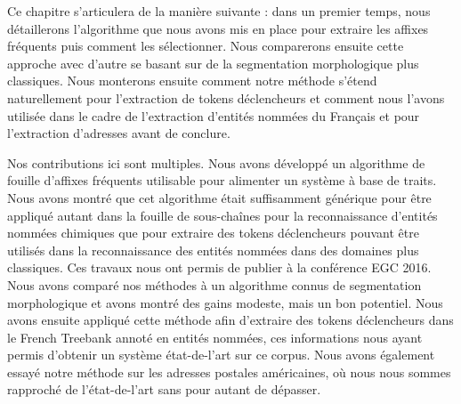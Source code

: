 \documentclass[PhD-Yoann-Dupont.tex]{subfiles}
\begin{document}
Ce chapitre s'articulera de la manière suivante : dans un premier temps, nous détaillerons l'algorithme que nous avons mis en place pour extraire les affixes fréquents puis comment les sélectionner. Nous comparerons ensuite cette approche avec d'autre se basant sur de la segmentation morphologique plus classiques. Nous monterons ensuite comment notre méthode s'étend naturellement pour l'extraction de tokens déclencheurs et comment nous l'avons utilisée dans le cadre de l'extraction d'entités nommées du Français et pour l'extraction d'adresses avant de conclure.

Nos contributions ici sont multiples. Nous avons développé un algorithme de fouille d'affixes fréquents utilisable pour alimenter un système à base de traits. Nous avons montré que cet algorithme était suffisamment générique pour être appliqué autant dans la fouille de sous-chaînes pour la reconnaissance d'entités nommées chimiques que pour extraire des tokens déclencheurs pouvant être utilisés dans la reconnaissance des entités nommées dans des domaines plus classiques. Ces travaux nous ont permis de publier à la conférence EGC 2016. Nous avons comparé nos méthodes à un algorithme connus de segmentation morphologique et avons montré des gains modeste, mais un bon potentiel. Nous avons ensuite appliqué cette méthode afin d'extraire des tokens déclencheurs dans le French Treebank annoté en entités nommées, ces informations nous ayant permis d'obtenir un système état-de-l'art sur ce corpus. Nous avons également essayé notre méthode sur les adresses postales américaines, où nous nous sommes rapproché de l'état-de-l'art sans pour autant de dépasser.
\end{document}
